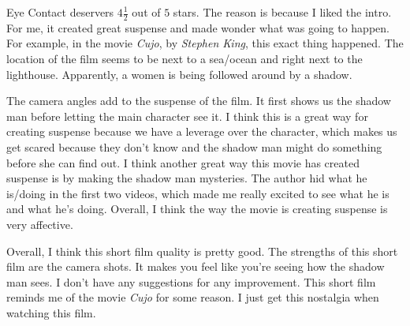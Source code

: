 Eye Contact deservers $4 \frac{1}{2}$ out of $5$ stars. The reason is because I
liked the intro. For me, it created great suspense and made wonder what was
going to happen. For example, in the movie \textit{Cujo}, by
\textit{Stephen King}, this exact thing happened. The location of the film
seems to be next to a sea/ocean and right next to the lighthouse. Apparently, a
women is being followed around by a shadow.

The camera angles add to the suspense of the film. It first shows us the shadow
man before letting the main character see it. I think this is a great way for
creating suspense because we have a leverage over the character, which makes us
get scared because they don't know and the shadow man might do something before
she can find out. I think another great way this movie has created suspense is
by making the shadow man mysteries. The author hid what he is/doing in the first
two videos, which made me really excited to see what he is and what he's doing.
Overall, I think the way the movie is creating suspense is very affective.

Overall, I think this short film quality is pretty good. The strengths of this
short film are the camera shots. It makes you feel like you're seeing how the
shadow man sees. I don't have any suggestions for any improvement. This short
film reminds me of the movie \textit{Cujo} for some reason. I just get this
nostalgia when watching this film.
